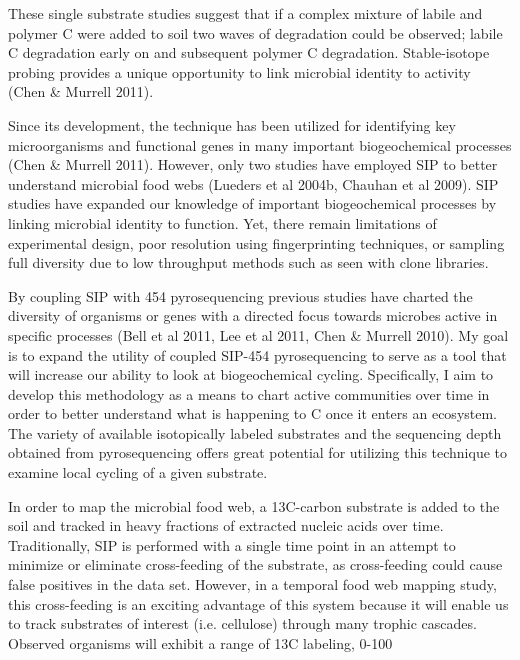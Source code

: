 These single substrate studies suggest that if a complex mixture of labile and polymer C were added to soil two waves of degradation could be observed; labile C degradation early on and subsequent polymer C degradation.  
Stable-isotope probing provides a unique opportunity to link microbial identity to activity (Chen & Murrell 2011).  

Since its development, the technique has been utilized for identifying key microorganisms and functional genes in many important biogeochemical processes (Chen & Murrell 2011).  However, only two studies have employed SIP to better understand microbial food webs (Lueders et al 2004b, Chauhan et al 2009). SIP studies have expanded our knowledge of important biogeochemical processes by linking microbial identity to function.  Yet, there remain limitations of experimental design, poor resolution using fingerprinting techniques, or sampling full diversity due to low throughput methods such as seen with clone libraries.   

By coupling SIP with 454 pyrosequencing previous studies have charted the diversity of organisms or genes with a directed focus towards microbes active in specific processes (Bell et al 2011, Lee et al 2011, Chen & Murrell 2010).  My goal is to expand the utility of coupled SIP-454 pyrosequencing to serve as a tool that will increase our ability to look at biogeochemical cycling.  Specifically, I aim to develop this methodology as a means to chart active communities over time in order to better understand what is happening to C once it enters an ecosystem. The variety of available isotopically labeled substrates and the sequencing depth obtained from pyrosequencing offers great potential for utilizing this technique to examine local cycling of a given substrate.  

In order to map the microbial food web, a 13C-carbon substrate is added to the soil and tracked in heavy fractions of extracted nucleic acids over time.  Traditionally, SIP is performed with a single time point in an attempt to minimize or eliminate cross-feeding of the substrate, as cross-feeding could cause false positives in the data set.  However, in a temporal food web mapping study, this cross-feeding is an exciting advantage of this system because it will enable us to track substrates of interest (i.e. cellulose) through many trophic cascades.  Observed organisms will exhibit a range of 13C labeling, 0-100%




